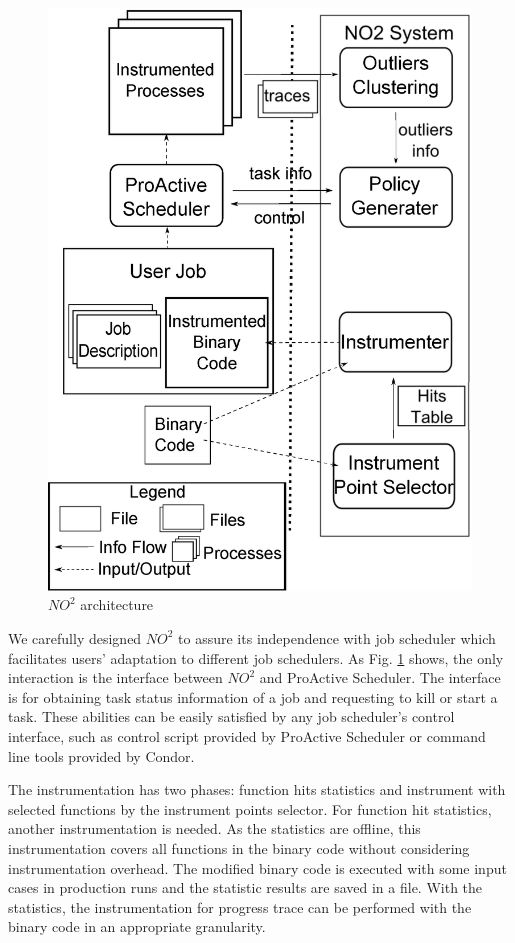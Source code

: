 \begin{figure}
\centering
\includegraphics[width=0.9\columnwidth]{figures/NO2_arch.eps}
\caption{$NO^2$ architecture}
\label{figure:no2arch}
\end{figure}

We carefully designed $NO^2$ to assure its independence with job scheduler which
facilitates users' adaptation to different job schedulers. As Fig.
\ref{figure:no2arch} shows, the only interaction is the interface between $NO^2$ and
ProActive Scheduler. The interface is for obtaining task status information of a job and
requesting to kill or start a task. These abilities can be easily satisfied by any job
scheduler's control interface, such as control script provided by ProActive Scheduler or
command line tools provided by Condor.

The instrumentation has two phases: function hits statistics and instrument with selected
functions by the instrument points selector. For function hit statistics, another
instrumentation is needed. As the statistics are offline, this instrumentation covers all
functions in the binary code without considering instrumentation overhead. The
modified binary code is executed with some input cases in production runs and
the statistic results are saved in a file. With the statistics, the instrumentation for progress
trace can be performed with the binary code in an appropriate granularity.

